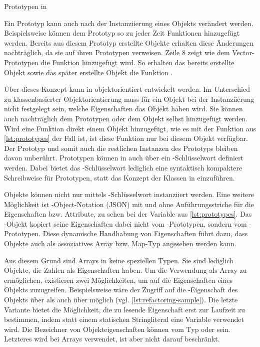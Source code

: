 \documentclass[a4paper]{scrartcl}
\begin{document}
\begin{listing}[htb]
	\centering
	\vspace*{-7mm}
	\caption{Prototypen in \js{}}
	\label{lst:prototypes}
\end{listing}

Ein Prototyp kann auch nach der Instanziierung eines Objekts verändert werden.
Beispielsweise können dem Prototyp so zu jeder Zeit Funktionen hinzugefügt werden.
Bereits aus diesem Prototyp erstellte Objekte erhalten diese Änderungen nachträglich, da sie auf ihren Prototypen verweisen.
Zeile 8 zeigt wie dem Vector-Prototypen die Funktion  hinzugefügt wird.
So erhalten das bereits erstellte Objekt  sowie das später erstellte Objekt  die Funktion .

Über dieses Konzept kann in \js{} objektorientiert entwickelt werden.
Im Unterschied zu klassenbasierter Objektorientierung muss für ein Objekt bei der Instanziierung nicht festgelegt sein, welche Eigenschaften das Objekt haben wird.
Sie können auch nachträglich dem Prototypen oder dem Objekt selbst hinzugefügt werden.
Wird eine Funktion direkt einem Objekt hinzugefügt, wie es mit der Funktion  aus \autoref{lst:prototypes} der Fall ist, ist diese Funktion nur bei diesem Objekt verfügbar.
Der Prototyp und somit auch die restlichen Instanzen des Prototyps bleiben davon unberührt.
Prototypen können in \js{} auch über ein \tsclass-Schlüsselwort definiert werden.
Dabei bietet das \tsclass-Schlüsselwort lediglich eine syntaktisch kompaktere Schreibweise für Prototypen, statt das Konzept der Klassen in \js{} einzuführen.

Objekte können nicht nur mittels \tsnew-Schlüsselwort instanziiert werden.
Eine weitere Möglichkeit ist \js-Object-Notation (JSON) mit und ohne Anführungsstriche für die Eigenschaften bzw. Attribute, zu sehen bei der Variable  aus \autoref{lst:prototypes}.
Das  -Objekt kopiert seine Eigenschaften dabei nicht vom -Prototypen, sondern vom -Prototypen.
Diese dynamische Handhabung von Eigenschaften führt dazu, dass Objekte auch als assoziatives Array bzw. Map-Typ angesehen werden kann.

Aus diesem Grund sind Arrays in \js{} keine speziellen Typen.
Sie sind lediglich Objekte, die Zahlen als Eigenschaften haben.
Um die Verwendung als Array zu ermöglichen, existieren zwei Möglichkeiten, um auf die Eigenschaften eines Objekts zuzugreifen.
Beispielsweise wäre der Zugriff auf die -Eigenschaft des Objekts  über  als auch über  möglich (vgl. \autoref{lst:refactoring-sample}).
Die letzte Variante bietet die Möglichkeit, die zu lesende Eigenschaft erst zur Laufzeit zu bestimmen, indem statt einem statischen Stringliteral eine Variable verwendet wird.
Die Bezeichner von Objekteigenschaften können vom Typ \tsstring{} oder \tsnumber{} sein.
Letzteres wird bei Arrays verwendet, ist aber nicht darauf beschränkt.
\end{document}
